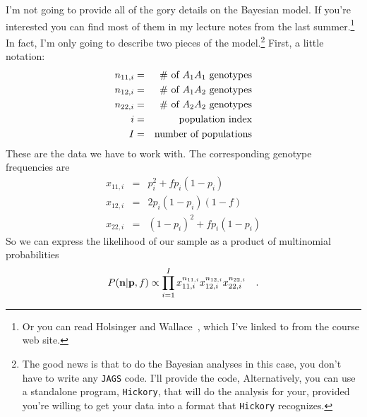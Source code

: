 \documentclass[12pt]{article}
\begin{document}
I'm not going to provide all of the gory details on the Bayesian
model. If you're interested you can find most of them in my lecture
notes from the 
last summer.\footnote{Or you can read Holsinger and
  Wallace~\cite{Holsinger-Wallace-2004}, which I've linked to from the
  course web site.} In fact, I'm only going to describe two pieces of
the model.\footnote{The good news is that to do the Bayesian analyses
  in this case, you don't have to write any {\tt JAGS} code. I'll
  provide the code, Alternatively, you can use a standalone program,
  {\tt Hickory}, that will do the analysis for your, provided you're
  willing to get your data into a format that {\tt Hickory}
  recognizes.} First, a little notation:
\begin{eqnarray*}
n_{11,i} &=& \hbox{\# of $A_1A_1$ genotypes} \\
n_{12,i} &=& \hbox{\# of $A_1A_2$ genotypes} \\
n_{22,i} &=& \hbox{\# of $A_2A_2$ genotypes} \\
i         &=& \hbox{population index} \\
I         &=& \hbox{number of populations} \\
\end{eqnarray*}
These are the data we have to work with. The corresponding genotype
frequencies are
\begin{eqnarray*}
x_{11,i} &=& p_{i}^2 + fp_{i}(1-p_{i}) \\
x_{12,i} &=& 2p_{i}(1-p_{i})(1-f) \\
x_{22,i} &=& (1-p_{i})^2 + fp_{i}(1-p_{i})
\end{eqnarray*}
So we can express the likelihood of our sample as a product of
multinomial probabilities
\[
P({\bf n}|{\bf p},f) \propto \prod_{i=1}^I x_{11,i}^{n_{11,i}}
x_{12,i}^{n_{12,i}} x_{22,i}^{n_{22,i}} \quad .
\]
\end{document}
